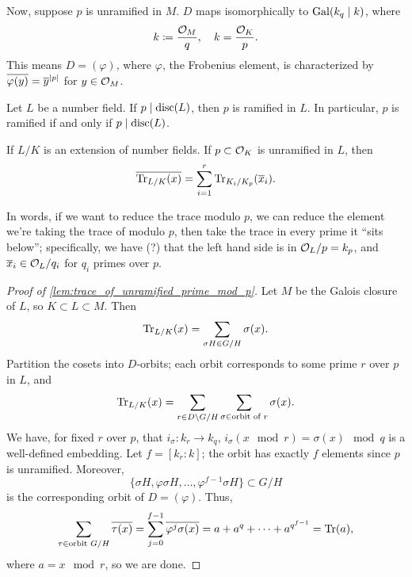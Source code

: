 \newpage
Now, suppose $p$ is unramified in $M$. $D$ maps isomorphically to $\operatorname{Gal}(k_q \mid k)$, where
\[ k \coloneq \frac{\mathcal O_M}{q}, \quad k = \frac{\mathcal O_K}{p}. \]
This means $D = (\varphi)$, where $\varphi$, the Frobenius element, is characterized by $\overline{\varphi(y)} = \overline y^{\left\lvert p \right\rvert}$ for $y \in \mathcal O_M$.
\begin{theorem} \label{thm:ramification_if_and_only_if_divides_discriminant}
    Let $L$ be a number field. If $p \mid \operatorname{disc}(L)$, then $p$ is ramified in $L$. In particular, $p$ is ramified if and only if $p \mid \operatorname{disc}(L)$.
\end{theorem}
\begin{lemma} \label{lem:trace_of_unramified_prime_mod_p}
    If $L/K$ is an extension of number fields. If $p \subset \mathcal O_K$ is unramified in $L$, then
    \[ \overline{\operatorname{Tr}_{L/K}(x)} = \sum_{i=1}^r \operatorname{Tr}_{K_i/K_p}(\overline x_i). \]
\end{lemma} \vspace{-8pt}
In words, if we want to reduce the trace modulo $p$, we can reduce the element we're taking the trace of modulo $p$, then take the trace in every prime it ``sits below''; specifically, we have (?) that the left hand side is in $\mathcal O_L/p = k_p$, and $\overline x_i \in \mathcal O_L/q_i$ for $q_i$ primes over $p$.
\begin{proof}[Proof of \ref{lem:trace_of_unramified_prime_mod_p}]
    Let $M$ be the Galois closure of $L$, so $K \subset L \subset M$. Then
    \[ \operatorname{Tr}_{L/K}(x) = \sum_{\sigma H \in G/H} \sigma(x). \]
    Partition the cosets into $D$-orbits; each orbit corresponds to some prime $r$ over $p$ in $L$, and
    \[ \operatorname{Tr}_{L/K}(x) = \sum_{r \in D \backslash G / H} \sum_{\sigma \in \text{orbit of $r$}} \sigma(x). \]
    We have, for fixed $r$ over $p$, that $i_\sigma \colon k_r \to k_q$, $i_\sigma(x \mod r) = \sigma(x) \mod q$ is a well-defined embedding. Let $f = [k_r : k]$; the orbit has exactly $f$ elements since $p$ is unramified. Moreover,
    \[ \{\sigma H, \varphi \sigma H, \dots, \varphi^{f-1} \sigma H\} \subset G/H \]
    is the corresponding orbit of $D = (\varphi)$. Thus,
    \[ \sum_{\tau \in \text{orbit $G/H$}} \overline{\tau(x)} = \sum_{j=0}^{f-1} \overline{\varphi^j \sigma(x)} = a + a^q + \dots + a^{q^{f-1}} = \operatorname{Tr}(a), \]
    where $a = x \mod r$, so we are done. 
\end{proof}
